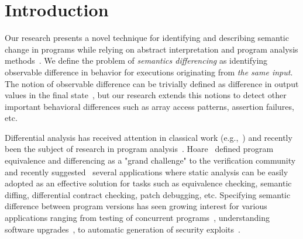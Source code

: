 \section{Introduction} 

Our research presents a novel technique for identifying and describing semantic change in programs while relying on abstract interpretation and program analysis methods~\cite{CousotCousot77}. We define the problem of \emph{semantics differencing} as identifying observable difference in behavior for executions originating from \emph{the same input}. The notion of observable difference can be trivially defined as difference in output values in the final state~\cite{DwyerElbaumPerson08,GodlinStrichman09,EnglerRamos11,HawblitzelKawaguchiLahiriRebelo12}, but our research extends this notions to detect other important behavioral differences such as array access patterns, assertion failures, etc.


Differential analysis has received attention in classical work (e.g.,~\cite{Horwitz90,Horwitz89,JacksonLadd94}) and recently been the subject of research in program analysis~\cite{DwyerElbaumPerson08,GodlinStrichman09,EnglerRamos11,HawblitzelKawaguchiLahiriRebelo12}. Hoare~\cite{Hoare69} defined program equivalence and differencing as a "grand challenge" to the verification community and recently suggested~\cite{HoareLahiriVaswani10} several applications where static analysis can be easily adopted as an effective solution for tasks such as equivalence checking, semantic diffing, differential contract checking, patch debugging, etc. Specifying semantic difference between program versions has seen growing interest for various applications ranging from testing of concurrent programs~\cite{ChakiGurfinkelStrichman12}, understanding software upgrades~\cite{JinOrsoXie10}, to automatic generation of security exploits~\cite{BrumleyPoosankamSongZheng08}.

